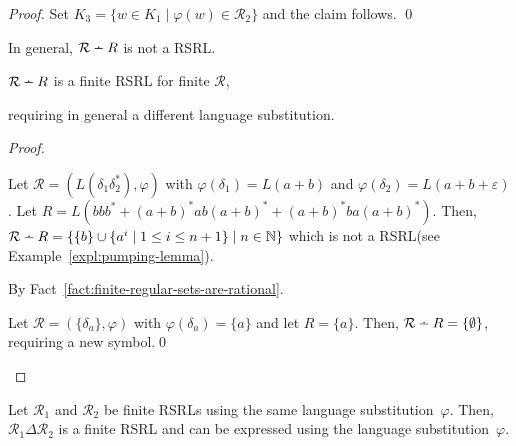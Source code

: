 \documentclass[envcountsame]{llncs}
\newcommand{\rationalset}{\ensuremath{\mathcal{R}}\xspace}
\newcommand{\bN}{\ensuremath{\mathbb{N}}\xspace}
\newcommand{\dotdiv}{\:\ensuremath{\mathaccent\cdot-}\:}
\newcommand{\RegularlyGeneratedLanguageSetAbbrev}{RSRL\xspace}
\newcommand{\RegularlyGeneratedLanguageSetsAbbrev}{RSRLs\xspace}
\begin{document}
\begin{proof}
Set $K_3=\{w\in K_1 \mid \varphi(w)\in \rationalset_2\}$ and
    the claim follows. \qed
\end{proof}


\begin{proposition}
  \label{prop:closure:pw-difference}
  \begin{inparaenum}
  \item\label{prop:closure:pw-difference:a} In general, $\rationalset
    \dotdiv R$ is not a \RegularlyGeneratedLanguageSetAbbrev.
  \item\label{prop:closure:pw-difference:b} $\rationalset \dotdiv R$
    is a finite \RegularlyGeneratedLanguageSetAbbrev for finite \rationalset, 
  \item\label{prop:closure:pw-difference:c} requiring in general a
    different language substitution.
  \end{inparaenum}
\end{proposition}

\begin{proof}
  \begin{inparaenum}[\bfseries(1)]
  \item Let $\rationalset = (L(\delta_1\delta_2^*), \varphi)$ with
    $\varphi(\delta_1) = L(a + b)$ and $\varphi(\delta_2) = L(a + b +
    \varepsilon)$.  Let $R = L(bbb^* + (a + b)^*ab(a + b)^* + (a +
    b)^*ba(a + b)^*)$.  Then, $\rationalset \dotdiv R = \{ \{ b \}
    \cup \{ a^i \mid 1 \leq i \leq n + 1\} \mid n \in \bN\}$ which is
    not a \RegularlyGeneratedLanguageSetAbbrev (see Example~\ref{expl:pumping-lemma}).
  \item By Fact~\ref{fact:finite-regular-sets-are-rational}.
  \item Let $\rationalset = (\{\delta_a\}, \varphi)$ with
    $\varphi(\delta_a) = \{ a \}$ and let $R = \{ a \}$.  Then,
    $\rationalset \dotdiv R = \{ \emptyset \}$, requiring a new
    symbol.\qed
	\end{inparaenum}
\end{proof}





\begin{proposition}
  \label{prop:closure:sym-difference}
Let $\rationalset_1$ and
    $\rationalset_2$ be finite \RegularlyGeneratedLanguageSetsAbbrev using the same language
    substitution~$\varphi$.  Then,
    $\rationalset_1\Delta\rationalset_2$ is a finite \RegularlyGeneratedLanguageSetAbbrev and
    can be expressed using the language substitution~$\varphi$.
\end{proposition}
\end{document}
